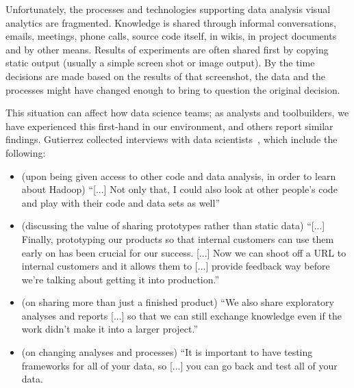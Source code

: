 Unfortunately, the processes and technologies supporting data analysis visual analytics are fragmented.
Knowledge is shared through informal conversations, emails,
meetings, phone calls, source code itself, in wikis, in project documents and
by other means. Results of experiments are often shared first by copying static
output (usually a simple screen shot or image output). By the time
decisions are made based on the results of that screenshot, the data
and the processes might have changed enough to bring to question the
original decision.


This situation can affect how data science teams; as analysts and
toolbuilders, we have experienced this first-hand in our environment, and
others report similar findings. Gutierrez collected interviews with data
scientists~\cite{Gutierrez:2014:DSA}, which include the following:

\begin{itemize}
\item (upon being given access to other code and data analysis, in
order to learn about Hadoop) ``[...] Not only that, I could also look at other people’s code and
play with their code and data sets as well''
\item (discussing the value of sharing prototypes rather than static
data) ``[...] Finally, prototyping our products so that internal
customers can use them early on has been crucial for
our success. [...] Now we can shoot off a URL to internal
customers and it allows them to [...] provide feedback way before
we're talking about getting it into production.''
\item (on sharing more than just a finished product) ``We also share
exploratory analyses and reports [...] so that we can still exchange
knowledge even if the work didn't make it into a larger project.''
\item (on changing analyses and processes) ``It is important to
have testing frameworks for all of your data, so [...] you can go back and test all
of your data. 
\end{itemize}

